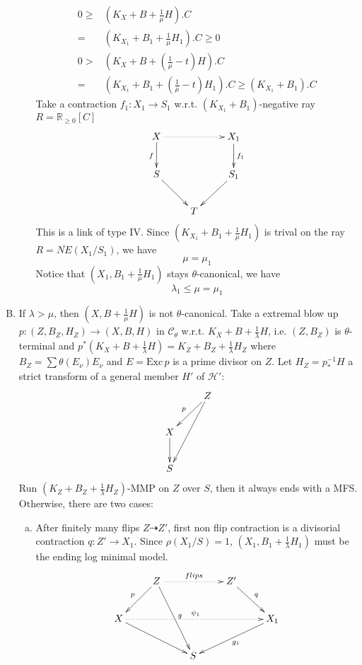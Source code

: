 \documentclass{article}
\begin{document}
\begin{enumerate}[(A)]
\begin{enumerate}[1)]
    \begin{equation*}
      \begin{aligned}
        0\geqslant& (K_X+B+\frac{1}{\mu}H).C\\
        =&(K_{X_1}+B_1+\frac{1}{\mu}H_1).C\geqslant 0\\
        0> &(K_X+B+(\frac{1}{\mu}-t)H).C\\
        =&(K_{X_1}+B_1+(\frac{1}{\mu}-t)H_1).C\geqslant (K_{X_1}+B_1).C
      \end{aligned}
    \end{equation*}
  Take a contraction $ f_1:X_1\to S_1 $ w.r.t. $ (K_{X_1}+B_1) $-negative ray $ R=\mathbb{R}_{\geqslant 0}[C] $
    $$ \xymatrix{
      X\ar[d]_f\ar@{.>}[rr]&&X_1\ar[d]^{f_1}\\
      S\ar[dr]&&S_1\ar[dl]\\
      &T &}$$
    This is a link of type IV. Since $ (K_{X_1}+B_1+\frac{1}{\mu}H_1) $ is trival on the ray $ R=\overline{NE}(X_1/S_1) $, we  have 
    $$ \mu=\mu_1 $$
    Notice that $ (X_1,B_1+\frac{1}{\mu}H_1) $ stays $ \theta $-canonical, we have
    $$ \lambda_1\leqslant \mu=\mu_1 $$
  \end{enumerate}
  \item If $ \lambda>\mu $, then $ (X,B+\frac{1}{\mu}H) $ is not $ \theta $-canonical. Take a extremal blow up $ p:(Z,B_Z,H_Z)\to (X,B,H) $ in $ \mathcal{C}_\theta $ w.r.t. $ K_X+B+\frac{1}{\lambda}H $, i.e. $ (Z,B_Z) $ is $ \theta $-terminal and $ p^*(K_X+B+\frac{1}{\lambda}H)=K_Z+B_Z+\frac{1}{\lambda}H_Z $ where $ B_Z=\sum\theta(E_\nu)E_\nu $ and $ E=\mathrm{Exc}\,p $ is a prime divisor on $ Z $.  Let $ H_Z=p^{-1}_*H $ a strict transform of a general member $ H' $ of $ \mathcal{H}' $: 
  $$ \xymatrix{
    &Z\ar[ld]_p\ar[ldd]\\
    X\ar[d]&\\
    S} $$
  Run $ (K_Z+B_Z+\frac{1}{\lambda}H_Z) $-MMP on $ Z $ over $ S $, then it always ends with a MFS. Otherwise, there are two cases:
  \begin{enumerate}[a)]
    \item After finitely many flips $ Z\dashrightarrow Z' $, first non flip contraction is a divisorial contraction $ q:Z'\to X_1 $. Since $ \rho(X_1/S)=1 $, $ (X_1,B_1+\frac{1}{\lambda}H_1) $ must be the ending log minimal model.
      $$ \xymatrix{
      &Z\ar[ld]_p\ar[rdd]^{g}\ar@{.>}[rr]^{flips}&&Z'\ar[dr]^{q}&\\
      X\ar[drr]\ar@{.>}[rrrr]^{\psi_1}&&&&X_1\ar[dll]^{g_1}\\
      &&S&&} $$

\end{enumerate}
\end{enumerate}
\end{document}
